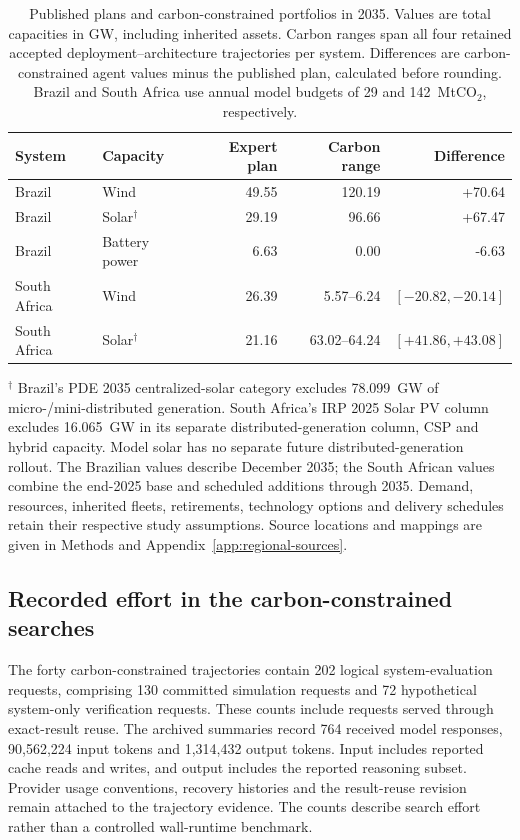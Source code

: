 \documentclass[pdflatex,sn-nature]{sn-jnl}
\begin{document}
\begin{table}[tbp]
\caption{Published plans and carbon-constrained portfolios in 2035. Values are total capacities in GW, including inherited assets. Carbon ranges span all four retained accepted deployment--architecture trajectories per system. Differences are carbon-constrained agent values minus the published plan, calculated before rounding. Brazil and South Africa use annual model budgets of 29 and 142~MtCO$_2$, respectively.}
\label{tab:expert-capacity}
\centering\small
\setlength{\tabcolsep}{5pt}
\begin{tabularx}{\textwidth}{@{}lXrrr@{}}
\toprule
System & Capacity & Expert plan & Carbon range & Difference \\
\midrule
Brazil & Wind & 49.55 & 120.19 & +70.64 \\
Brazil & Solar$^\dagger$ & 29.19 & 96.66 & +67.47 \\
Brazil & Battery power & 6.63 & 0.00 & -6.63 \\
South Africa & Wind & 26.39 & 5.57--6.24 & \([-20.82,-20.14]\) \\
South Africa & Solar$^\dagger$ & 21.16 & 63.02--64.24 & \([+41.86,+43.08]\) \\
\bottomrule
\end{tabularx}
\smallskip
\par\footnotesize $^\dagger$ Brazil's PDE 2035 centralized-solar category excludes 78.099~GW of micro-/mini-distributed generation. South Africa's IRP 2025 Solar PV column excludes 16.065~GW in its separate distributed-generation column, CSP and hybrid capacity. Model solar has no separate future distributed-generation rollout. The Brazilian values describe December 2035; the South African values combine the end-2025 base and scheduled additions through 2035. Demand, resources, inherited fleets, retirements, technology options and delivery schedules retain their respective study assumptions. Source locations and mappings are given in Methods and Appendix~\ref{app:regional-sources}.
\end{table}

\subsection{Recorded effort in the carbon-constrained searches}\label{sec:carbon-search-process}

The forty carbon-constrained trajectories contain 202 logical system-evaluation requests, comprising 130 committed simulation requests and 72 hypothetical system-only verification requests. These counts include requests served through exact-result reuse. The archived summaries record 764 received model responses, 90,562,224 input tokens and 1,314,432 output tokens. Input includes reported cache reads and writes, and output includes the reported reasoning subset. Provider usage conventions, recovery histories and the result-reuse revision remain attached to the trajectory evidence. The counts describe search effort rather than a controlled wall-runtime benchmark.
\end{document}
